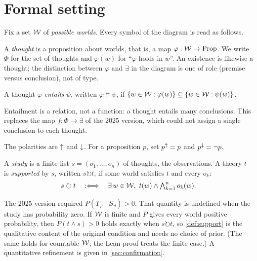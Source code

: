 \section{Formal setting}\label{sec:setting}

Fix a set $\mathcal W$ of \emph{possible worlds}. Every symbol of the diagram is read as follows.

\begin{definition}[Thought]
A \emph{thought} is a proposition about worlds, that is, a map $\varphi:\mathcal W\to\mathrm{Prop}$. We
write $\Phi$ for the set of thoughts and $\varphi(w)$ for ``$\varphi$ holds in $w$''. An
existence is likewise a thought; the distinction between $\varphi$ and $\exists$ in the diagram is
one of role (premise versus conclusion), not of type.
\end{definition}

\begin{definition}[Entailment]\label{def:entails}
A thought $\varphi$ \emph{entails} $\psi$, written $\varphi\models\psi$, if
$\{w\in\mathcal W : \varphi(w)\}\subseteq\{w\in\mathcal W : \psi(w)\}$.
\end{definition}

Entailment is a relation, not a function: a thought entails many conclusions. This replaces the
map $f:\Phi\to\exists$ of the 2025 version, which could not assign a single conclusion to each
thought.

\begin{definition}[Polarity]
The polarities are ${\uparrow}$ and ${\downarrow}$. For a proposition $p$, set $p^{{\uparrow}}=p$ and $p^{{\downarrow}}=\neg p$.
\end{definition}

\begin{definition}\label{def:support}
A \emph{study} is a finite list $s=(o_1,\dots,o_n)$ of thoughts, the observations. A theory $t$ is
\emph{supported} by $s$, written $s\circlearrowright t$, if some world satisfies $t$ and every
$o_k$:
\[
  s\circlearrowright t \quad:\Longleftrightarrow\quad \exists\, w\in\mathcal W,\ t(w)\wedge
  \textstyle\bigwedge_{k=1}^n o_k(w).
\]
\end{definition}

\begin{remark}\label{rem:probability}
The 2025 version required $P(T_\varphi\mid S_\exists)>0$. That quantity is undefined when the
study has probability zero. If $\mathcal W$ is finite and $P$ gives every world positive probability,
then $P(t\wedge s)>0$ holds exactly when $s\circlearrowright t$, so \cref{def:support} is the
qualitative content of the original condition and needs no choice of prior. (The same holds for
countable $\mathcal W$; the Lean proof treats the finite case.) A quantitative refinement is given in
\cref{sec:confirmation}.
\end{remark}
